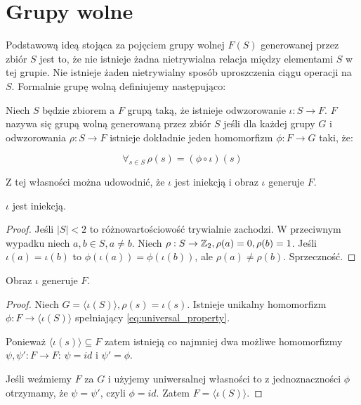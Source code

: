 \chapter{Grupy wolne}
\label{ch:free_groups}
Podstawową ideą stojąca za pojęciem grupy wolnej $F(S)$ generowanej przez zbiór
$S$ jest to, że nie istnieje żadna nietrywialna relacja między elementami $S$ w
tej grupie. Nie istnieje żaden nietrywialny sposób uproszczenia ciągu operacji
na $S$.
Formalnie grupę wolną definiujemy następująco:

\begin{defin}
  Niech $S$ będzie zbiorem a $F$ grupą taką, że istnieje odwzorowanie $\iota: S
  \rightarrow F$. $F$ nazywa się grupą wolną generowaną przez zbiór $S$ jeśli
  dla każdej grupy $G$ i odwzorowania $\rho: S \rightarrow F$ istnieje dokładnie
  jeden homomorfizm $\phi: F \rightarrow G$ taki, że:

  \begin{equation}
  \forall_{s \in S} \,\rho(s) = (\phi \circ \iota) (s)
    \label{eq:universal_property}
  \end{equation}
  \label{def:universal_property}
\end{defin}

Z tej własności można udowodnić, że $\iota$ jest iniekcją i obraz $\iota$
generuje $F$.

\begin{corollary}
  $\iota$ jest iniekcją.
\end{corollary}
\begin{proof}
  Jeśli $|S| < 2$ to różnowartościowość trywialnie zachodzi. W przeciwnym
  wypadku niech $a, b \in S, a \neq b$. Niech $\rho: S \rightarrow \mathbb{Z}_2, \rho(a)
  = 0, \rho(b) = 1$. Jeśli $\iota(a) = \iota(b)$ to $\phi(\iota(a)) =
  \phi(\iota(b))$, ale $\rho(a) \neq \rho(b)$. Sprzeczność.
\end{proof}

\begin{corollary}
  Obraz $\iota$ generuje $F$.
\end{corollary}
\begin{proof}
  Niech $G = \langle \iota(S) \rangle, \rho(s) = \iota(s)$.
  Istnieje unikalny homomorfizm $\phi: F \rightarrow \langle \iota(S) \rangle$
  spełniający \ref{eq:universal_property}.

  Ponieważ $\langle \iota(s) \rangle \subseteq F$ zatem istnieją co najmniej dwa
  możliwe homomorfizmy $\psi, \psi': F \rightarrow F$: $\psi = id$ i
  $\psi' = \phi$.

  Jeśli weźmiemy $F$ za $G$ i użyjemy uniwersalnej własności to z
  jednoznaczności $\phi$ otrzymamy, że $\psi = \psi'$, czyli $\phi = id$. Zatem
  $F = \langle \iota(S)\rangle$.
\end{proof}

